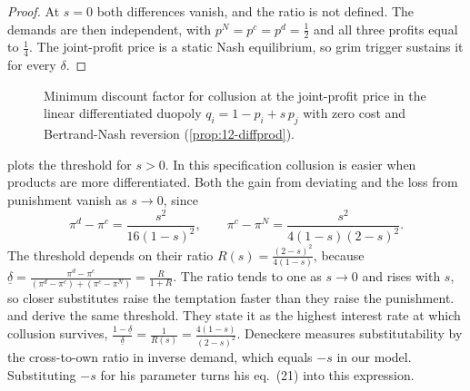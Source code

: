 \begin{proof}
At $s = 0$ both differences vanish, and the ratio is not defined. The demands are then independent, with
$p^N = p^c = p^d = \frac{1}{2}$ and all three profits equal to $\frac{1}{4}$. The joint-profit price is a static Nash
equilibrium, so grim trigger sustains it for every $\delta$.
\end{proof}

\begin{figure}[htbp]
\centering
{}
\caption{Minimum discount factor for collusion at the joint-profit price in the linear differentiated duopoly
$q_i = 1 - p_i + s\,p_j$ with zero cost and Bertrand-Nash reversion (\cref{prop:12-diffprod}).}
\label{fig:12-diffprod-delta}
\end{figure}

 plots the threshold for $s > 0$. In this specification collusion is easier when products are more
differentiated. Both the gain from deviating and the loss from punishment vanish as $s \to 0$, since
\begin{equation*}
\pi^d - \pi^c = \frac{s^2}{16(1 - s)^2}, \qquad \pi^c - \pi^N = \frac{s^2}{4(1 - s)(2 - s)^2} .
\end{equation*}
The threshold depends on their ratio $R(s) = \frac{(2 - s)^2}{4(1 - s)}$, because
$\underline\delta = \frac{\pi^d - \pi^c}{(\pi^d - \pi^c) + (\pi^c - \pi^N)} = \frac{R}{1 + R}$. The ratio tends to one as
$s \to 0$ and rises with $s$, so closer substitutes raise the temptation faster than they raise the punishment.
\citet[eq.~(21)]{Deneckere1983} and \citet[eq.~(8)]{Ross1992} derive the same threshold. They state it as the highest
interest rate at which collusion survives, $\frac{1 - \underline\delta}{\underline\delta} = \frac{1}{R(s)} =
\frac{4(1 - s)}{(2 - s)^2}$. Deneckere measures substitutability by the cross-to-own ratio in inverse demand, which
equals $-s$ in our model. Substituting $-s$ for his parameter turns his eq.~(21) into this expression.

